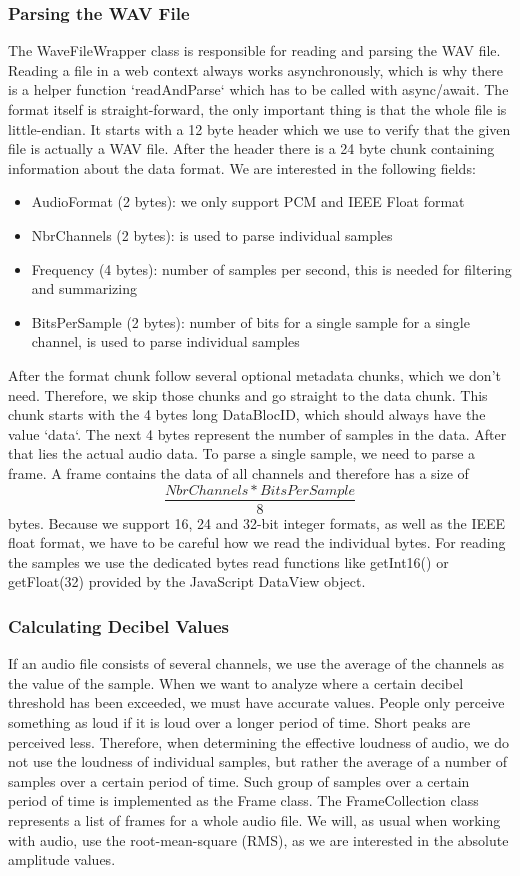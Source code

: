 \subsubsection{Parsing the WAV File}
The WaveFileWrapper class is responsible for reading and parsing the WAV file.
Reading a file in a web context always works asynchronously, which is why there is a helper function `readAndParse` which has to be called with async/await.
The format itself is straight-forward\cite{wav_file_format_wikipedia}, the only important thing is that the whole file is little-endian.
It starts with a 12 byte header which we use to verify that the given file is actually a WAV file.
After the header there is a 24 byte chunk containing information about the data format.
We are interested in the following fields:
\begin{itemize}
    \item AudioFormat (2 bytes): we only support PCM and IEEE Float format
    \item NbrChannels (2 bytes): is used to parse individual samples
    \item Frequency (4 bytes): number of samples per second, this is needed for filtering and summarizing
    \item BitsPerSample (2 bytes): number of bits for a single sample for a single channel, is used to parse individual samples
\end{itemize}
After the format chunk follow several optional metadata chunks, which we don't need. Therefore, we skip those chunks and go straight to the data chunk.
This chunk starts with the 4 bytes long DataBlocID, which should always have the value `data`.
The next 4 bytes represent the number of samples in the data.
After that lies the actual audio data.
To parse a single sample, we need to parse a frame.
A frame contains the data of all channels and therefore has a size of \[\frac{NbrChannels * BitsPerSample}{8}\] bytes.
Because we support 16, 24 and 32-bit integer formats, as well as the IEEE float format, we have to be careful how we read the individual bytes. 
For reading the samples we use the dedicated bytes read functions like getInt16() or getFloat(32) provided by the JavaScript DataView object.

\subsubsection{Calculating Decibel Values}
If an audio file consists of several channels, we use the average of the channels as the value of the sample.
When we want to analyze where a certain decibel threshold has been exceeded, we must have accurate values.
People only perceive something as loud if it is loud over a longer period of time.
Short peaks are perceived less.
Therefore, when determining the effective loudness of audio, we do not use the loudness of individual samples,
but rather the average of a number of samples over a certain period of time.
Such group of samples over a certain period of time is implemented as the Frame class. The FrameCollection class represents
a list of frames for a whole audio file.
We will, as usual when working with audio, use the root-mean-square (RMS), as we are interested in the absolute amplitude values.

